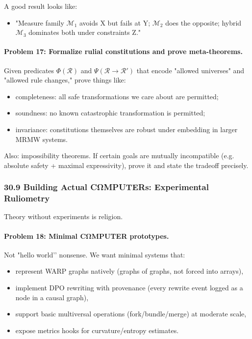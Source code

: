 A good result looks like:

\begin{itemize}
  \item "Measure family $\mathcal{M}_1$ avoids X but fails at Y; $\mathcal{M}_2$ does the opposite; hybrid $\mathcal{M}_3$ dominates both under constraints Z."
\end{itemize}

\paragraph{Problem 17: Formalize rulial constitutions and prove meta-theorems.}

Given predicates $\Phi(\mathcal{R})$ and $\Psi(\mathcal{R}\to\mathcal{R}')$ that encode "allowed universes" and "allowed rule changes," prove things like:

\begin{itemize}
  \item completeness: all safe transformations we care about are permitted;
  \item soundness: no known catastrophic transformation is permitted;
  \item invariance: constitutions themselves are robust under embedding in larger MRMW systems.
\end{itemize}

Also: impossibility theorems.
If certain goals are mutually incompatible (e.g. absolute safety + maximal expressivity), prove it and state the tradeoff precisely.

\subsubsection*{30.9  Building Actual CΩMPUTERs: Experimental Ruliometry}

Theory without experiments is religion.

\paragraph{Problem 18: Minimal CΩMPUTER prototypes.}

Not "hello world’’ nonsense. We want minimal systems that:

\begin{itemize}
  \item represent WARP graphs natively (graphs of graphs, not forced into arrays),
  \item implement DPO rewriting with provenance (every rewrite event logged as a node in a causal graph),
  \item support basic multiversal operations (fork/bundle/merge) at moderate scale,
  \item expose metrics hooks for curvature/entropy estimates.
\end{itemize}

